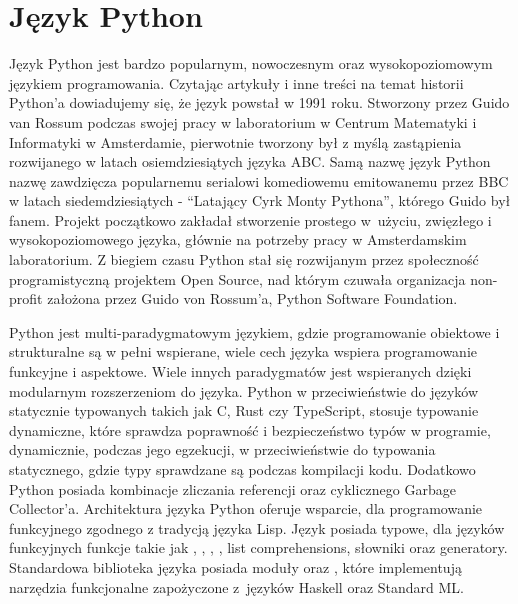 


\section{Język Python}
\label{section:python}
Język Python \cite{IntroducingPython} \cite{AdvancedPythonDevelopment} \cite{ExpertPythonProgramming} jest bardzo popularnym, nowoczesnym oraz wysokopoziomowym językiem programowania. Czytając artykuły i inne treści na temat historii Python'a \cite{HistoriaPythona} \cite{WikipediaPythonProgrammingLanauge} dowiadujemy się, że język powstał w 1991 roku. Stworzony przez Guido van Rossum podczas swojej pracy w laboratorium w Centrum Matematyki i Informatyki w Amsterdamie, pierwotnie tworzony był z myślą zastąpienia rozwijanego w latach osiemdziesiątych języka ABC. Samą nazwę język Python nazwę zawdzięcza popularnemu serialowi komediowemu emitowanemu przez BBC w latach siedemdziesiątych - ``Latający Cyrk Monty Pythona'', którego Guido był fanem.
Projekt początkowo zakładał stworzenie prostego w~użyciu, zwięzłego i wysokopoziomowego języka, głównie na potrzeby pracy w Amsterdamskim laboratorium. Z biegiem czasu Python stał się rozwijanym przez społeczność programistyczną projektem Open Source, nad którym czuwała organizacja non-profit założona przez Guido von Rossum'a, Python Software Foundation.

Python jest multi-paradygmatowym językiem, gdzie programowanie obiektowe i strukturalne są w pełni wspierane, wiele cech języka wspiera programowanie funkcyjne i aspektowe. Wiele innych paradygmatów jest wspieranych dzięki modularnym rozszerzeniom do języka.
Python w przeciwieństwie do języków statycznie typowanych takich jak C, Rust czy TypeScript, stosuje typowanie dynamiczne, które sprawdza poprawność i bezpieczeństwo typów w programie, dynamicznie, podczas jego egzekucji, w przeciwieństwie do typowania statycznego, gdzie typy sprawdzane są podczas kompilacji kodu. Dodatkowo Python posiada kombinacje zliczania referencji oraz cyklicznego Garbage Collector'a.
Architektura języka Python oferuje wsparcie, dla programowanie funkcyjnego zgodnego z tradycją języka Lisp. Język posiada typowe, dla języków funkcyjnych funkcje takie jak , , , , list comprehensions, słowniki oraz generatory. Standardowa biblioteka języka posiada moduły  oraz , które implementują narzędzia funkcjonalne zapożyczone z~języków Haskell oraz Standard ML.

